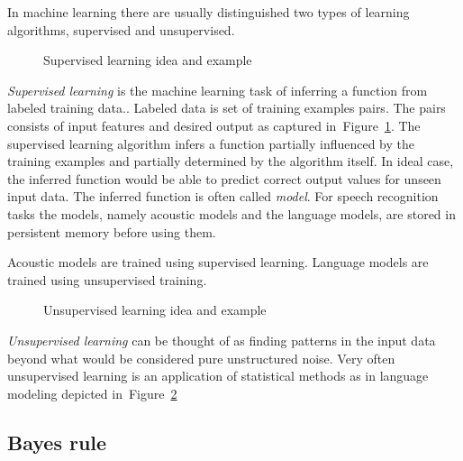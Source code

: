 In machine learning there are usually distinguished two types of learning algorithms, supervised and unsupervised.

\begin{figure}[!htp]
    \begin{center}
    
    
    \caption{Supervised learning idea and example}
    \label{fig:supervised} 
    \end{center}
\end{figure}
{\it Supervised learning} is the machine learning task of inferring a function from labeled training data.\cite{mohri2012foundations}. Labeled data is set of training examples pairs. The pairs consists of input features and desired output as captured in~Figure~\ref{fig:supervised}. The supervised learning algorithm infers a function partially influenced by the training examples and partially determined by the algorithm itself. In ideal case, the inferred function would be able to predict correct output values for unseen input data. 
The inferred function is often called {\it model}. For speech recognition tasks the models, namely acoustic models and the language models, are stored in persistent memory before using them. 

Acoustic models are trained using supervised learning. Language models are trained using unsupervised training. 

\begin{figure}[!htp]
    \begin{center}
    
    
    \caption{Unsupervised learning idea and example}
    \label{fig:unsupervised} 
    \end{center}
\end{figure}
{\it Unsupervised learning} can be thought of as finding patterns in the input data beyond what would be considered pure unstructured noise\cite{ghahramani2004unsupervised}. Very often unsupervised learning is an application of statistical methods as in language modeling depicted in~Figure~\ref{fig:unsupervised}

\subsection{Bayes rule}
\label{sub:bayes_rule}








